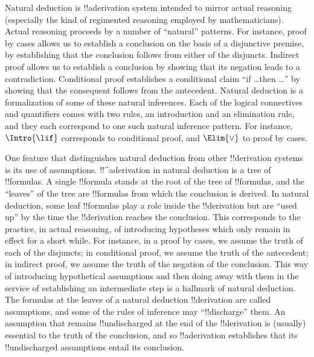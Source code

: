 \documentclass[../../../include/open-logic-section]{subfiles}
\begin{document}


Natural deduction is !!a{derivation} system intended to mirror actual
reasoning (especially the kind of regimented reasoning employed by
mathematicians).  Actual reasoning proceeds by a number of ``natural''
patterns. For instance, proof by cases allows us to establish a
conclusion on the basis of a disjunctive premise, by establishing that
the conclusion follows from either of the disjuncts. Indirect proof
allows us to establish a conclusion by showing that its negation leads
to a contradiction. Conditional proof establishes a conditional claim
``if \dots then \dots'' by showing that the consequent follows from
the antecedent.  Natural deduction is a formalization of some of these
natural inferences.  Each of the logical connectives and quantifiers
comes with two rules, an introduction and an elimination rule, and
they each correspond to one such natural inference pattern. For
instance, $\Intro{\lif}$ corresponds to conditional proof, and
$\Elim{\lor}$ to proof by cases.

One feature that distinguishes natural deduction from other
!!{derivation} systems is its use of assumptions. !!^a{derivation} in
natural deduction is a tree of !!{formula}s.  A single !!{formula}
stands at the root of the tree of !!{formula}s, and the ``leaves'' of
the tree are !!{formula}s from which the conclusion is derived.  In
natural deduction, some leaf !!{formula}s play a role inside the
!!{derivation} but are ``used up'' by the time the !!{derivation}
reaches the conclusion. This corresponds to the practice, in actual
reasoning, of introducing hypotheses which only remain in effect for a
short while.  For instance, in a proof by cases, we assume the truth
of each of the disjuncts; in conditional proof, we assume the truth of
the antecedent; in indirect proof, we assume the truth of the negation
of the conclusion.  This way of introducing hypothetical assumptions
and then doing away with them in the service of establishing an
intermediate step is a hallmark of natural deduction. The formulas at
the leaves of a natural deduction !!{derivation} are called
assumptions, and some of the rules of inference may ``!!{discharge}''
them.  An assumption that remains !!{undischarged} at the end of the
!!{derivation} is (usually) essential to the truth of the conclusion,
and so !!a{derivation} establishes that its !!{undischarged}
assumptions entail its conclusion.
\end{document}
